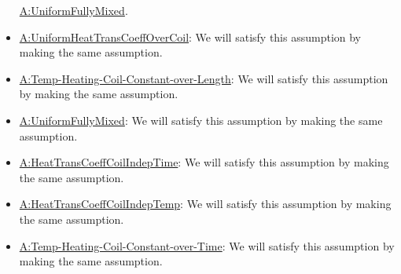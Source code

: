 \documentclass[12pt]{article}
\begin{document}
\begin{itemize}
\hyperref[assumpFullyMixed]{A:UniformFullyMixed}.
\item \hyperref[assumpUnifHeatTransCoeffCoil]{A:UniformHeatTransCoeffOverCoil}:
We will satisfy this assumption by making the same assumption.
\item \hyperref[assumpTHCCoL]{A:Temp-Heating-Coil-Constant-over-Length}: We will
satisfy this assumption by making the same assumption.
\item \hyperref[assumpFullyMixed]{A:UniformFullyMixed}: We will satisfy this
assumption by making the same assumption.
\item \hyperref[assumpHeatTransCoilIndepTime]{A:HeatTransCoeffCoilIndepTime}: We
will satisfy this assumption by making the same assumption.
\item \hyperref[assumpHeatTransCoilIndepTemp]{A:HeatTransCoeffCoilIndepTemp}: We
will satisfy this assumption by making the same assumption.
\item \hyperref[assumpTHCCoT]{A:Temp-Heating-Coil-Constant-over-Time}: We will
satisfy this assumption by making the same assumption.
\end{itemize}

\end{document}

